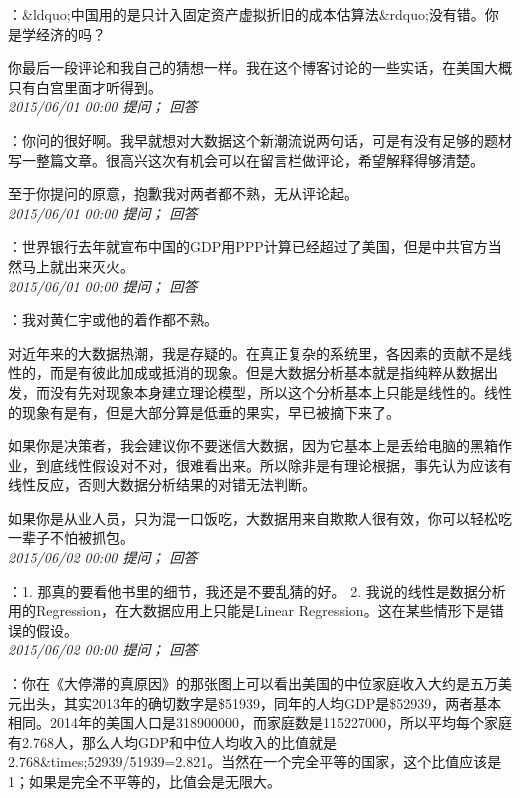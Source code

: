 \documentclass[twocolumn]{ctexart}
\begin{document}
：\&ldquo;中国用的是只计入固定资产虚拟折旧的成本估算法\&rdquo;没有错。你是学经济的吗？

你最后一段评论和我自己的猜想一样。我在这个博客讨论的一些实话，在美国大概只有白宫里面才听得到。\\

\textit{\hfill\noindent\small 2015/06/01 00:00 提问； 回答}

：你问的很好啊。我早就想对大数据这个新潮流说两句话，可是有没有足够的题材写一整篇文章。很高兴这次有机会可以在留言栏做评论，希望解释得够清楚。

至于你提问的原意，抱歉我对两者都不熟，无从评论起。\\

\textit{\hfill\noindent\small 2015/06/01 00:00 提问； 回答}

：世界银行去年就宣布中国的GDP用PPP计算已经超过了美国，但是中共官方当然马上就出来灭火。\\

\textit{\hfill\noindent\small 2015/06/01 00:00 提问； 回答}

：我对黄仁宇或他的着作都不熟。

对近年来的大数据热潮，我是存疑的。在真正复杂的系统里，各因素的贡献不是线性的，而是有彼此加成或抵消的现象。但是大数据分析基本就是指纯粹从数据出发，而没有先对现象本身建立理论模型，所以这个分析基本上只能是线性的。线性的现象有是有，但是大部分算是低垂的果实，早已被摘下来了。

如果你是决策者，我会建议你不要迷信大数据，因为它基本上是丢给电脑的黑箱作业，到底线性假设对不对，很难看出来。所以除非是有理论根据，事先认为应该有线性反应，否则大数据分析结果的对错无法判断。

如果你是从业人员，只为混一口饭吃，大数据用来自欺欺人很有效，你可以轻松吃一辈子不怕被抓包。\\

\textit{\hfill\noindent\small 2015/06/02 00:00 提问； 回答}

：1. 那真的要看他书里的细节，我还是不要乱猜的好。
2. 我说的线性是数据分析用的Regression，在大数据应用上只能是Linear Regression。这在某些情形下是错误的假设。\\

\textit{\hfill\noindent\small 2015/06/02 00:00 提问； 回答}

：你在《大停滞的真原因》的那张图上可以看出美国的中位家庭收入大约是五万美元出头，其实2013年的确切数字是\$51939，同年的人均GDP是\$52939，两者基本相同。2014年的美国人口是318900000，而家庭数是115227000，所以平均每个家庭有2.768人，那么人均GDP和中位人均收入的比值就是2.768\&times;52939/51939=2.821。当然在一个完全平等的国家，这个比值应该是1；如果是完全不平等的，比值会是无限大。
\end{document}
